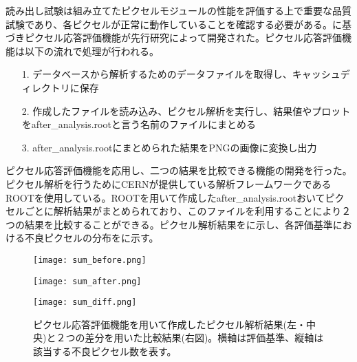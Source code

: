 読み出し試験は組み立てたピクセルモジュールの性能を評価する上で重要な品質試験であり、各ピクセルが正常に動作していることを確認する必要がある。に基づきピクセル応答評価機能が先行研究\cite{oku}によって開発された。ピクセル応答評価機能は以下の流れで処理が行われる。
\begin{itemize}
  \item[1. ] データベースから解析するためのデータファイルを取得し、キャッシュディレクトリに保存
  \item[2. ] 作成したファイルを読み込み、ピクセル解析を実行し、結果値やプロットをafter\_analysis.rootと言う名前のファイルにまとめる
  \item[3. ] after\_analysis.rootにまとめられた結果をPNGの画像に変換し出力
\end{itemize}

ピクセル応答評価機能を応用し、二つの結果を比較できる機能の開発を行った。ピクセル解析を行うためにCERNが提供している解析フレームワークであるROOTを使用している。ROOTを用いて作成したafter\_analysis.rootおいてピクセルごとに解析結果がまとめられており、このファイルを利用することにより２つの結果を比較することができる。ピクセル解析結果をに示し、各評価基準における不良ピクセルの分布をに示す。

\begin{figure}[tbp]
 \begin{minipage}{0.33\hsize}
  \begin{center}
   \texttt{[image: sum\_before.png]}
  \end{center}
 \end{minipage}
 \begin{minipage}{0.33\hsize}
 \begin{center}
  \texttt{[image: sum\_after.png]}
 \end{center}
 \end{minipage}
 \begin{minipage}{0.33\hsize}
 \begin{center}
  \texttt{[image: sum\_diff.png]}
 \end{center}
 \end{minipage}
 \caption[ピクセル応答評価機能を用いて作成したピクセル解析結果と２つの差分を用いた比較結果]{ピクセル応答評価機能を用いて作成したピクセル解析結果(左・中央)と２つの差分を用いた比較結果(右図)。横軸は評価基準、縦軸は該当する不良ピクセル数を表す。}
 \label{fig:badsum}
\end{figure}

